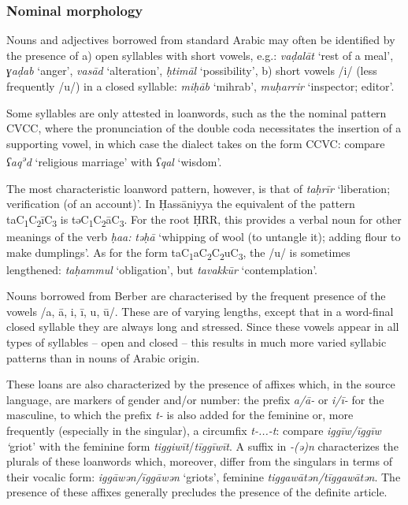 \documentclass[output=paper]{langsci/langscibook}
\begin{document}
\subsubsection{ Nominal morphology} %


Nouns and adjectives borrowed from standard Arabic may often be identified by the presence of a) open syllables with short vowels, e.g.: \textit{vaḍa}\textit{lāt} ‘rest of a meal’, \textit{ɣaḍab} ‘anger’, \textit{vasād} ‘alteration’, \textit{ḥtimāl} ‘possibility’, b) short vowels /i/ (less frequently /u/) in a closed syllable: \textit{miḥ{\R}āb} ‘mihrab’, \textit{muḥarrir} ‘inspector; editor’.

Some syllables are only attested in loanwords, such as the the nominal pattern CVCC, where the pronunciation of the double coda necessitates the insertion of a supporting vowel, in which case the dialect takes on the form CCVC: compare \textit{ʕaq\textsuperscript{ə}}\textit{d} ‘religious marriage’ with \textit{ʕqal} ‘wisdom’.

The most characteristic loanword pattern, however, is that of \textit{taḥrīr} ‘liberation; verification (of an account)’. In Ḥassāniyya the equivalent of the pattern taC\textsubscript{1}C\textsubscript{2}īC\textsubscript{3} is təC\textsubscript{1}C\textsubscript{2}āC\textsubscript{3}. For the root ḤRR, this provides a verbal noun for other meanings of the verb \textit{ḥa{\R}{\R}a{\R}:} \textit{təḥ{\R}ā{\R}} ‘whipping of wool (to untangle it); adding flour to make dumplings’. As for the form taC\textsubscript{1}aC\textsubscript{2}C\textsubscript{2}uC\textsubscript{3}, the /u/ is sometimes lengthened: \textit{taḥammul} ‘obligation’, but \textit{tavakkūr} ‘contemplation’.


Nouns borrowed from Berber are characterised by the frequent presence of the vowels /a, ā, i, ī, u, ū/. These are of varying lengths, except that in a word-final closed syllable they are always long and stressed. Since these vowels appear in all types of syllables – open and closed – this results in much more varied syllabic patterns than in nouns of Arabic origin. 

These loans are also characterized by the presence of affixes which, in the source language, are markers of gender and/or number: the prefix \textit{a/ā-} or \textit{i/ī-} for the masculine, to which the prefix \textit{t-} is also added for the feminine or, more frequently (especially in the singular), a circumfix \textit{t-...-t}: compare \textit{iggīw/īggīw} \textit{‘}griot’ with the feminine form \textit{tiggiwīt}/\textit{tīggīwīt}. A suffix in \textit{{}-(ə)n} characterizes the plurals of these loanwords which, moreover, differ from the singulars in terms of their vocalic form: \textit{iggāwən/īggāwən} ‘griots’, feminine \textit{tiggawātən/tīggawātən}. The presence of these affixes generally precludes the presence of the definite article.
\end{document}
